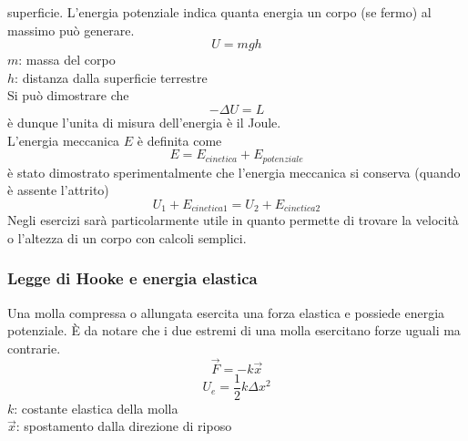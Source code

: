 superficie. L'energia potenziale indica quanta energia un corpo (se fermo) al massimo può generare.
\begin{equation*}
  U = mgh
\end{equation*}
$m$: massa del corpo\\
$h$: distanza dalla superficie terrestre\\ [\baselineskip]
Si può dimostrare che
\begin{equation*}
  -\Delta U = L
\end{equation*}
è dunque l'unita di misura dell'energia è il Joule.\\ [\baselineskip]
L'energia meccanica $E$ è definita come
\begin{equation*}
  E=E_{cinetica}+E_{potenziale}
\end{equation*}
è stato dimostrato sperimentalmente che l'energia meccanica si conserva (quando è assente 
l'attrito)
\begin{equation*}
  U_1 + E_{cinetica1} = U_2 + E_{cinetica2}
\end{equation*}
Negli esercizi sarà particolarmente utile in quanto permette di trovare la velocità o l'altezza di
un corpo con calcoli semplici.\\ [\baselineskip]

\subsubsection{Legge di Hooke e energia elastica}
Una molla compressa o allungata esercita una forza elastica e possiede energia potenziale. È da 
notare che i due estremi di una molla esercitano forze uguali ma contrarie.
\begin{equation*}
  \vec{F} = -k\vec{x}
\end{equation*}
\begin{equation*}
  U_e = \frac{1}{2}k\Delta x^2
\end{equation*}
$k$: costante elastica della molla\\
$\vec{x}$: spostamento dalla direzione di riposo\\[\baselineskip]

